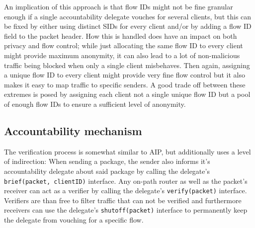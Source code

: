 \documentclass{acm_proc_article-sp}
\begin{document}
An implication of this approach is that flow IDs might not be fine granular enough if a single accountability delegate vouches for several clients, but this can be fixed by either using distinct SIDs for every client and/or by adding a flow ID field to the packet header. How this is handled does have an impact on both privacy and flow control; while just allocating the same flow ID to every client might provide maximum anonymity, it can also lead to a lot of non-malicious traffic being blocked when only a single client misbehaves. Then again, assigning a unique flow ID to every client might provide very fine flow control but it also makes it easy to map traffic to specific senders. A good trade off between these extremes is posed by assigning each client not a single unique flow ID but a pool of enough flow IDs to ensure a sufficient level of anonymity. 

\subsection{Accountability mechanism}

The verification process is somewhat similar to AIP, but additionally uses a level of indirection: When sending a package, the sender also informs it's accountability delegate about said package by calling the delegate's \texttt{brief(packet, clientID)} interface. Any on-path router as well as the packet's receiver can act as a verifier by calling the delegate's \texttt{verify(packet)} interface. Verifiers are than free to filter traffic that can not be verified and furthermore receivers can use the delegate's \texttt{shutoff(packet)} interface to permanently keep the delegate from vouching for a specific flow.
\end{document}
